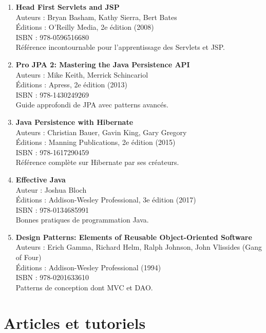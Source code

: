 \documentclass[12pt,a4paper]{report}
\begin{document}
\begin{enumerate}
    \item \textbf{Head First Servlets and JSP} \\
    Auteurs : Bryan Basham, Kathy Sierra, Bert Bates \\
    Éditions : O'Reilly Media, 2e édition (2008) \\
    ISBN : 978-0596516680 \\
    Référence incontournable pour l'apprentissage des Servlets et JSP.
    
    \item \textbf{Pro JPA 2: Mastering the Java Persistence API} \\
    Auteurs : Mike Keith, Merrick Schincariol \\
    Éditions : Apress, 2e édition (2013) \\
    ISBN : 978-1430249269 \\
    Guide approfondi de JPA avec patterns avancés.
    
    \item \textbf{Java Persistence with Hibernate} \\
    Auteurs : Christian Bauer, Gavin King, Gary Gregory \\
    Éditions : Manning Publications, 2e édition (2015) \\
    ISBN : 978-1617290459 \\
    Référence complète sur Hibernate par ses créateurs.
    
    \item \textbf{Effective Java} \\
    Auteur : Joshua Bloch \\
    Éditions : Addison-Wesley Professional, 3e édition (2017) \\
    ISBN : 978-0134685991 \\
    Bonnes pratiques de programmation Java.
    
    \item \textbf{Design Patterns: Elements of Reusable Object-Oriented Software} \\
    Auteurs : Erich Gamma, Richard Helm, Ralph Johnson, John Vlissides (Gang of Four) \\
    Éditions : Addison-Wesley Professional (1994) \\
    ISBN : 978-0201633610 \\
    Patterns de conception dont MVC et DAO.
\end{enumerate}

\section*{Articles et tutoriels}
\end{document}
